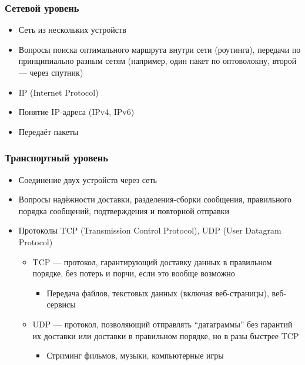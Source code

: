 \documentclass{../../slides-style}
\begin{document}
    \begin{frame}
        \frametitle{Сетевой уровень}
        \begin{itemize}
            \item Сеть из нескольких устройств
            \item Вопросы поиска оптимального маршрута внутри сети (роутинга), передачи по принципиально разным сетям (например, один пакет по оптоволокну, второй --- через спутник)
            \item IP (Internet Protocol)
            \item Понятие IP-адреса (IPv4, IPv6)
            \item Передаёт пакеты
        \end{itemize}
    \end{frame}

    \begin{frame}
        \frametitle{Транспортный уровень}
        \begin{itemize}
            \item Соединение двух устройств через сеть
            \item Вопросы надёжности доставки, разделения-сборки сообщения, правильного порядка сообщений, подтверждения и повторной отправки
            \item Протоколы TCP (Transmission Control Protocol), UDP (User Datagram Protocol)
            \begin{itemize}
                \item TCP --- протокол, гарантирующий доставку данных в правильном порядке, без потерь и порчи, если это вообще возможно
                \begin{itemize}
                    \item Передача файлов, текстовых данных (включая веб-страницы), веб-сервисы
                \end{itemize}
                \item UDP --- протокол, позволяющий отправлять ``датаграммы'' без гарантий их доставки или доставки в правильном порядке, но в разы быстрее TCP
                \begin{itemize}
                    \item Стриминг фильмов, музыки, компьютерные игры
                \end{itemize}
            \end{itemize}
        \end{itemize}
    \end{frame}
\end{document}
